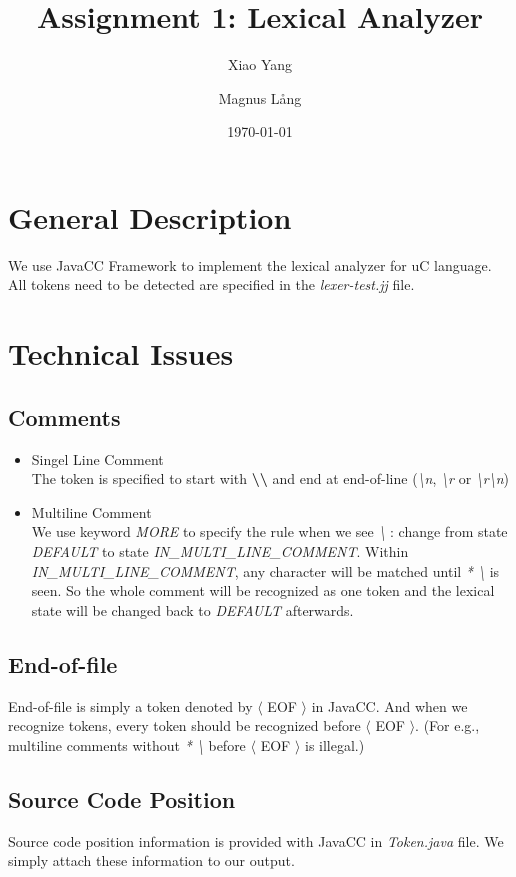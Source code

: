 \documentclass[a4paper,11pt]{article}
\title{Assignment 1: Lexical Analyzer}
\author{Xiao Yang \and Magnus L{\aa}ng} %
\date{\today}
\begin{document}
\maketitle
\section{General Description}
	We use JavaCC Framework to implement the lexical analyzer for uC language.
	All tokens need to be detected are specified in the \textit{lexer-test.jj} file.
	
	
	
\section{Technical Issues}
\subsection{Comments}
\begin{itemize}
	\item Singel Line Comment \\
	The token is specified to start with \textbf{\textbackslash \textbackslash} and end at end-of-line (\textit{\textbackslash n}, \textit{\textbackslash r} or \textit{\textbackslash r\textbackslash n})
	\item Multiline Comment \\
	We use keyword \emph{MORE} to specify the rule when we see \textit{\textbackslash *} : change from state \emph{DEFAULT} to state \emph{IN\_MULTI\_LINE\_COMMENT}. Within \emph{IN\_MULTI\_LINE\_COMMENT}, any character will be matched until \textit{* \textbackslash} is seen. So the whole comment will be recognized as one token and the lexical state will be changed back to \emph{DEFAULT} afterwards.
	
\end{itemize}
\subsection{End-of-file}
	End-of-file is simply a token denoted by $ \langle $ EOF $ \rangle $  in JavaCC. And when we recognize tokens, every token should be recognized before $ \langle $ EOF $ \rangle $. (For e.g., multiline comments without \textit{* \textbackslash} before $ \langle $ EOF $ \rangle $ is illegal.)
\subsection{Source Code Position}
	Source code position information is provided with JavaCC in \textit{Token.java} file. We simply attach these information to our output.
\end{document}

